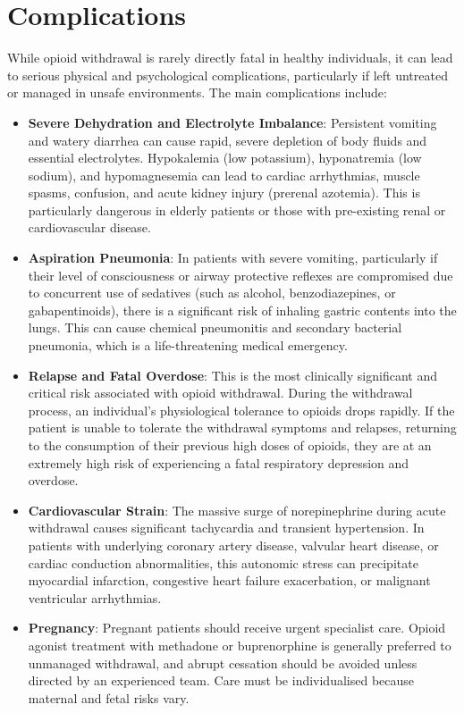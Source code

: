 \section*{Complications}
While opioid withdrawal is rarely directly fatal in healthy individuals, it can lead to serious physical and psychological complications, particularly if left untreated or managed in unsafe environments. The main complications include:
\begin{itemize}
    \item \textbf{Severe Dehydration and Electrolyte Imbalance}: Persistent vomiting and watery diarrhea can cause rapid, severe depletion of body fluids and essential electrolytes. Hypokalemia (low potassium), hyponatremia (low sodium), and hypomagnesemia can lead to cardiac arrhythmias, muscle spasms, confusion, and acute kidney injury (prerenal azotemia). This is particularly dangerous in elderly patients or those with pre-existing renal or cardiovascular disease.
    \item \textbf{Aspiration Pneumonia}: In patients with severe vomiting, particularly if their level of consciousness or airway protective reflexes are compromised due to concurrent use of sedatives (such as alcohol, benzodiazepines, or gabapentinoids), there is a significant risk of inhaling gastric contents into the lungs. This can cause chemical pneumonitis and secondary bacterial pneumonia, which is a life-threatening medical emergency.
    \item \textbf{Relapse and Fatal Overdose}: This is the most clinically significant and critical risk associated with opioid withdrawal. During the withdrawal process, an individual's physiological tolerance to opioids drops rapidly. If the patient is unable to tolerate the withdrawal symptoms and relapses, returning to the consumption of their previous high doses of opioids, they are at an extremely high risk of experiencing a fatal respiratory depression and overdose.
    \item \textbf{Cardiovascular Strain}: The massive surge of norepinephrine during acute withdrawal causes significant tachycardia and transient hypertension. In patients with underlying coronary artery disease, valvular heart disease, or cardiac conduction abnormalities, this autonomic stress can precipitate myocardial infarction, congestive heart failure exacerbation, or malignant ventricular arrhythmias.
    \item \textbf{Pregnancy}: Pregnant patients should receive urgent specialist care. Opioid agonist treatment with methadone or buprenorphine is generally preferred to unmanaged withdrawal, and abrupt cessation should be avoided unless directed by an experienced team. Care must be individualised because maternal and fetal risks vary.
\end{itemize}


